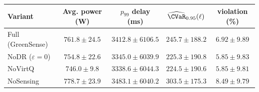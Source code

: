 \begin{tabular}{lcccc}
\toprule
Variant & Avg. power (W) & $p_{99}$ delay (ms) & $\widehat{\CVaR}_{0.95}(\ell)$ & violation (\%) \\
\midrule
Full (GreenSense) & $761.8\!\pm\!24.5$ & $3412.8\!\pm\!6106.5$ & $245.7\!\pm\!188.2$ & $6.92\!\pm\!9.89$ \\
NoDR ($\varepsilon{=}0$) & $754.8\!\pm\!22.6$ & $3345.0\!\pm\!6039.9$ & $225.3\!\pm\!190.8$ & $5.85\!\pm\!9.83$ \\
NoVirtQ & $746.0\!\pm\!9.8$ & $3338.6\!\pm\!6044.3$ & $224.5\!\pm\!190.6$ & $5.85\!\pm\!9.81$ \\
NoSensing & $778.7\!\pm\!23.9$ & $3483.1\!\pm\!6040.2$ & $303.5\!\pm\!175.3$ & $8.49\!\pm\!9.79$ \\
\bottomrule
\end{tabular}

